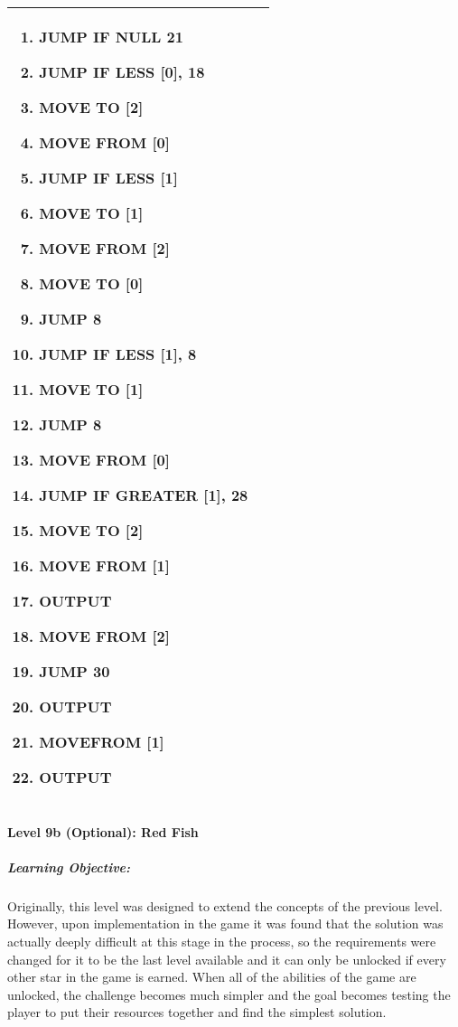 \begin{center}
\begin{tabular}{ | m{5cm} | m{9cm} | }
\begin{enumerate}
                \item JUMP IF NULL 21
                \item JUMP IF LESS [0], 18
                \item MOVE TO [2]
                \item MOVE FROM [0]
		\item JUMP IF LESS [1]
                \item MOVE TO [1]
                \item MOVE FROM [2]
                \item MOVE TO [0]
                \item JUMP 8
                \item JUMP IF LESS [1], 8
                \item MOVE TO [1]
                \item JUMP 8
                \item MOVE FROM [0]
		\item JUMP IF GREATER [1], 28
		\item MOVE TO [2]
		\item MOVE FROM [1]
		\item OUTPUT
		\item MOVE FROM [2]
		\item JUMP 30
                \item OUTPUT
                \item MOVEFROM [1]
                \item OUTPUT
            \end{enumerate}
            \\
        \hline
    \end{tabular}
\end{center}


\paragraph{Level 9b (Optional): Red Fish}
\subparagraph{Learning Objective:} Originally, this level was designed to extend the concepts of the previous level. However, upon implementation in the game it was found that the solution was actually deeply difficult at this stage in the process, so the requirements were changed for it to be the last level available and it can only be unlocked if every other star in the game is earned. When all of the abilities of the game are unlocked, the challenge becomes much simpler and the goal becomes testing the player to put their resources together and find the simplest solution.

